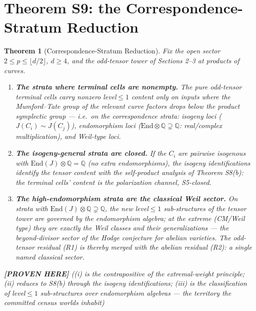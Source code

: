 \documentclass[11pt]{article}
\newtheorem{theorem}{Theorem}
\newcommand{\PROVEN}{\textbf{[PROVEN HERE]}}
\newcommand{\Q}{\mathbb{Q}}
\newcommand{\End}{\mathrm{End}}
\begin{document}
\section{Theorem S9: the Correspondence-Stratum Reduction}

\begin{theorem}[Correspondence-Stratum Reduction]\label{thm:s9}
Fix the open sector $2\le p\le\lfloor d/2\rfloor$, $d\ge4$, and the
odd-tensor tower of Sections 2--3 at products of curves.
\begin{enumerate}[label=(\roman*)]
\item \textbf{The strata where terminal cells are nonempty.} The pure
odd-tensor terminal cells carry nonzero level${}\le1$ content only on
inputs where the Mumford--Tate group of the relevant curve factors
drops below the product symplectic group --- i.e.\ on the
\emph{correspondence strata}: isogeny loci ($J(C_i)\sim J(C_j)$),
endomorphism loci ($\End\otimes\Q\supsetneq\Q$: real/complex
multiplication), and Weil-type loci.
\item \textbf{The isogeny-general strata are closed.} If the $C_i$ are
pairwise isogenous with $\End(J)\otimes\Q=\Q$ (no extra endomorphisms),
the isogeny identifications identify the tensor content with the
self-product analysis of Theorem S8(b): the terminal cells' content is
the polarization channel, S5-closed.
\item \textbf{The high-endomorphism strata are the classical Weil
sector.} On strata with $\End(J)\otimes\Q\supsetneq\Q$, the new
level${}\le1$ sub-structures of the tensor tower are governed by the
endomorphism algebra; at the extreme (CM/Weil type) they are exactly the
\emph{Weil classes} and their generalizations --- the beyond-divisor
sector of the Hodge conjecture for abelian varieties. The odd-tensor
residual (R1) is thereby \emph{merged} with the abelian residual (R2):
a single named classical sector.
\end{enumerate}
\PROVEN{} ((i) is the contrapositive of the extremal-weight principle;
(ii) reduces to S8(b) through the isogeny identifications; (iii) is the
classification of level${}\le1$ sub-structures over endomorphism
algebras --- the territory the committed census worlds inhabit)
\end{theorem}
\end{document}
